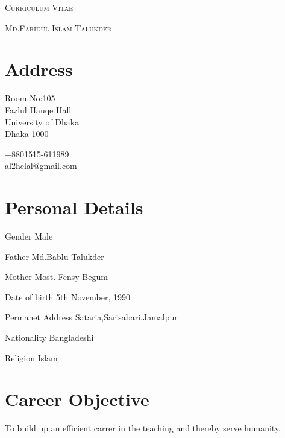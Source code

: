 \documentclass[a4paper]{article}
\begin{document}
\pagestyle{empty}

\begin{center}
\huge{\textsc{Curriculum Vitae}}
\vspace{\baselineskip}

\Large{\textsc{Md.Faridul Islam Talukder}}\\
\end{center}
\vspace{1.5\baselineskip}

\section{Address}
\noindent
\begin{minipage}{.7\textwidth}
  Room No:105\\
  Fazlul Hauqe Hall\\
  University of Dhaka\\
  Dhaka-1000\\
\end{minipage}
\begin{minipage}{.7\textwidth}
  \faPhone{} +8801515-611989\\
  \faEnvelopeO{}  \href{mailto:al2helal@gmail.com}{al2helal@gmail.com}\\
\end{minipage}

\section{Personal Details}
\begin{CV}
  \item[Gender] Male 
  \item[Father] Md.Bablu Talukder
  \item[Mother] Most. Fensy Begum
  \item[Date of birth] 5th November, 1990
  \item[Permanet Address] Sataria,Sarisabari,Jamalpur
  \item[Nationality] Bangladeshi
  \item[Religion] Islam
  \end{CV}

\section{Career Objective}
\begin{CV}
\item To build up an efficient carrer in the teaching and thereby serve humanity.
  \end{CV}
\end{document}
